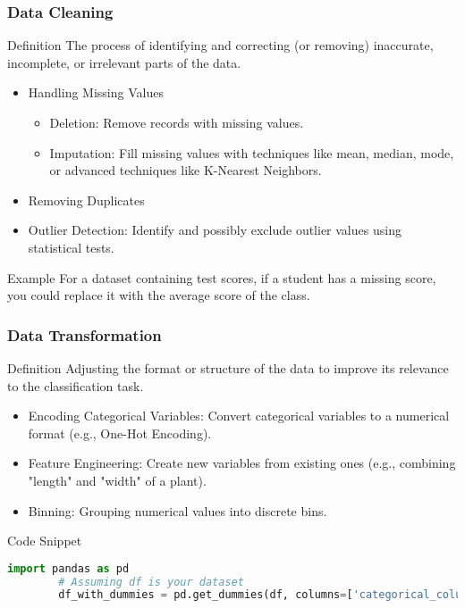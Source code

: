 \documentclass{beamer}
\begin{document}
\begin{frame}
    \frametitle{Data Cleaning}
    \begin{block}{Definition}
        The process of identifying and correcting (or removing) inaccurate, incomplete, or irrelevant parts of the data.
    \end{block}
    
    \begin{itemize}
        \item Handling Missing Values
        \begin{itemize}
            \item Deletion: Remove records with missing values.
            \item Imputation: Fill missing values with techniques like mean, median, mode, or advanced techniques like K-Nearest Neighbors.
        \end{itemize}
        \item Removing Duplicates
        \item Outlier Detection: Identify and possibly exclude outlier values using statistical tests.
    \end{itemize}
    
    \begin{block}{Example}
        For a dataset containing test scores, if a student has a missing score, you could replace it with the average score of the class.
    \end{block}
\end{frame}

\begin{frame}
    \frametitle{Data Transformation}
    \begin{block}{Definition}
        Adjusting the format or structure of the data to improve its relevance to the classification task.
    \end{block}
    
    \begin{itemize}
        \item Encoding Categorical Variables: Convert categorical variables to a numerical format (e.g., One-Hot Encoding).
        \item Feature Engineering: Create new variables from existing ones (e.g., combining "length" and "width" of a plant).
        \item Binning: Grouping numerical values into discrete bins.
    \end{itemize}
    
    \begin{block}{Code Snippet}
        \begin{lstlisting}[language=Python]
        import pandas as pd
        # Assuming df is your dataset
        df_with_dummies = pd.get_dummies(df, columns=['categorical_column'])
        \end{lstlisting}
    \end{block}
\end{frame}
\end{document}
